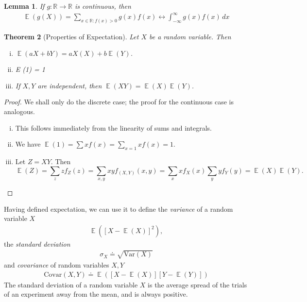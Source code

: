 \documentclass[12pt]{amsbook}
\newcommand{\rr}{\mathbb{R}}
\DeclareMathOperator{\ex}{\mathbb{E}}
\newcommand{\var}{\mathrm{Var}}
\newcommand{\covar}{\mathrm{Covar}}
\theoremstyle{plain}
\newtheorem{theorem}{Theorem}
\newtheorem{lemma}[theorem]{Lemma}
\theoremstyle{definition}
\theoremstyle{remark}
\numberwithin{equation}{section}  %
\begin{document}
	\begin{lemma}
		If $g: \rr \to \rr$ is continuous, then
		\begin{align*}
			\ex(g(X)) = \sum_{x \in \rr: f(x) > 0} g(x) f(x) \longleftrightarrow
			\int_{-\infty}^{\infty} g(x) f(x) \, dx
		\end{align*}
	\end{lemma}
	\begin{theorem}[Properties of Expectation]
		Let $X$ be a random variable. Then
		\begin{enumerate}[(i)]
			\item $\ex(a X + b Y) = a X(X) + b \ex(Y)$.
			\item E (1) = 1
			\item If $X,Y$ are independent, then $\ex(XY) = \ex(X)\ex(Y)$.
		\end{enumerate}
	\end{theorem}
	\begin{proof}
		We shall only do the discrete case; the proof for the continuous case is
		analogous.
		\begin{enumerate}[(i)]
			\item This follows immediately from the linearity of sums and integrals.
			\item
				We have $\ex(1) = \sum x f(x) = \sum_{x = 1} x f(x) = 1$.
			\item
				Let $Z = XY$. Then
				\[\ex(Z) = \sum_{z} z f_Z(z) = \sum_{x,y} x y f_{(X,Y)}(x,y) = \sum_x 
					x f_X(x)
				\sum_y y f_Y(y) = \ex(X) \ex(Y).\]
		\end{enumerate}
	\end{proof}
	Having defined expectation, we can use it to define the
	\emph{variance} of a random variable $X$
	\begin{align*}
		\ex({[X - \ex(X)]}^2),
	\end{align*}
	the \emph{standard deviation}
	\begin{align*}
		\sigma_X \doteq \sqrt{\var(X)}
	\end{align*}
	and \emph{covariance} of random variables $X, Y$
	\begin{align*}
		\covar(X,Y) \doteq \ex([X - \ex(X)][Y - \ex(Y)])
	\end{align*}
	The standard deviation of a random variable $X$ is the average spread of the
	trials of an experiment away from the mean, and is always positive. 
\end{document}
